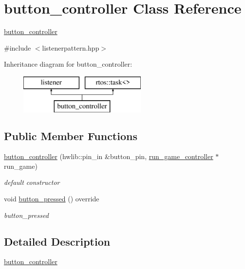 \hypertarget{classbutton__controller}{}\section{button\+\_\+controller Class Reference}
\label{classbutton__controller}


\hyperlink{classbutton__controller}{button\+\_\+controller}  




{\ttfamily \#include $<$listenerpattern.\+hpp$>$}

Inheritance diagram for button\+\_\+controller\+:\begin{figure}[H]
\begin{center}
\leavevmode
\includegraphics[height=2.000000cm]{classbutton__controller}
\end{center}
\end{figure}
\subsection*{Public Member Functions}
\begin{DoxyCompactItemize}
\item 
\hyperlink{classbutton__controller_a01cbbc0eed4933a6fe3fbf3ed565baf8}{button\+\_\+controller} (hwlib\+::pin\+\_\+in \&button\+\_\+pin, \hyperlink{classrun__game__controller}{run\+\_\+game\+\_\+controller} $\ast$run\+\_\+game)
\begin{DoxyCompactList}\small\item\em default constructor \end{DoxyCompactList}\item 
void \hyperlink{classbutton__controller_ac89e1b4894ecf3762958c97e2558d31b}{button\+\_\+pressed} () override
\begin{DoxyCompactList}\small\item\em button\+\_\+pressed \end{DoxyCompactList}\end{DoxyCompactItemize}


\subsection{Detailed Description}
\hyperlink{classbutton__controller}{button\+\_\+controller} 

